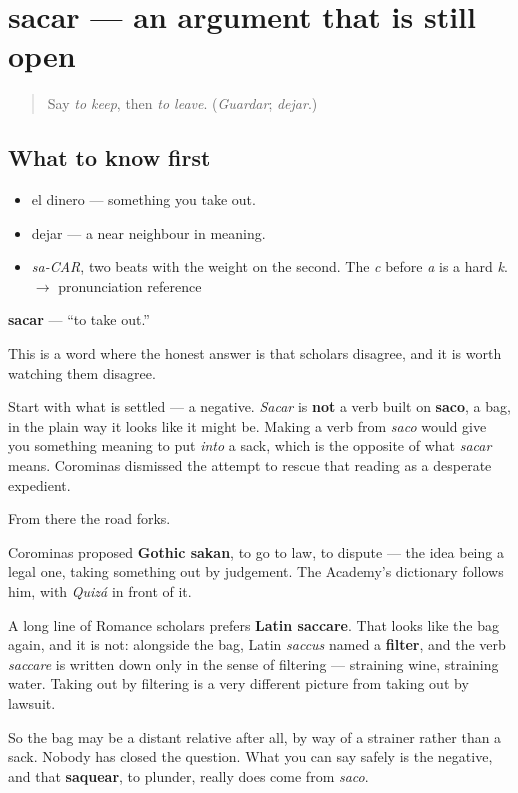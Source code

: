 \section[sacar]{sacar — an argument that is still open}

\label{lesson:ES-C383-sacar}



\begin{quote}
Say \emph{to keep}, then \emph{to leave}. (\emph{Guardar}; \emph{dejar}.)
\end{quote}

\subsection*{What to know first}
\begin{itemize}
\raggedright
  \item el dinero — something you take out.
  \item dejar — a near neighbour in meaning.
\end{itemize}

\begin{sounds}
\begin{itemize}
\raggedright
  \item \emph{sa-CAR}, two beats with the weight on the second. The \emph{c} before \emph{a} is a hard \emph{k}. $\to$ pronunciation reference
\end{itemize}
\end{sounds}

\begin{cousinweb}
\textbf{sacar} — \textquotedblleft{}to take out.\textquotedblright{}

This is a word where the honest answer is that scholars disagree, and it is worth watching them disagree.

Start with what is settled — a negative. \emph{Sacar} is \textbf{not} a verb built on \textbf{saco}, a bag, in the plain way it looks like it might be. Making a verb from \emph{saco} would give you something meaning to put \emph{into} a sack, which is the opposite of what \emph{sacar} means. Corominas dismissed the attempt to rescue that reading as a desperate expedient.

From there the road forks.

Corominas proposed \textbf{Gothic sakan}, to go to law, to dispute — the idea being a legal one, taking something out by judgement. The Academy's dictionary follows him, with \emph{Quizá} in front of it.

A long line of Romance scholars prefers \textbf{Latin saccare}. That looks like the bag again, and it is not: alongside the bag, Latin \emph{saccus} named a \textbf{filter}, and the verb \emph{saccare} is written down only in the sense of filtering — straining wine, straining water. Taking out by filtering is a very different picture from taking out by lawsuit.

So the bag may be a distant relative after all, by way of a strainer rather than a sack. Nobody has closed the question. What you can say safely is the negative, and that \textbf{saquear}, to plunder, really does come from \emph{saco}.
\end{cousinweb}

